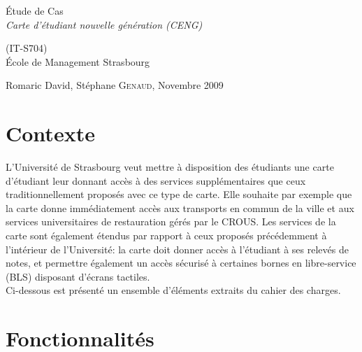 \documentclass[12pt]{article}
\begin{document}
\begin{center}
\begin{Large}
\'Etude de Cas \\
\textit{Carte d'étudiant nouvelle génération (CENG)}
\end{Large}

\begin{Large}
\emph{} (IT-S704)\\
\'Ecole de Management Strasbourg\\
\end{Large}

\vspace{.3cm}
\begin{large}
Romaric David, Stéphane \textsc{Genaud}, Novembre 2009 
\end{large}

\end{center}







\vspace{.5cm}
\section{Contexte}
L'Université de Strasbourg veut mettre à disposition des étudiants une carte d'étudiant
leur donnant accès à des services supplémentaires que ceux traditionnellement proposés
avec ce type de carte. Elle souhaite par exemple que la carte donne immédiatement
accès aux transports en commun de la ville et aux services universitaires de restauration 
gérés par le CROUS.
Les services de la carte sont également étendus par rapport à ceux proposés précédemment
à l'intérieur de l'Université: la carte doit donner accès à l'étudiant à ses relevés de notes,
et permettre également un accès sécurisé à certaines bornes en libre-service (BLS) disposant
d'écrans tactiles.\\

\noindent %
Ci-dessous est présenté un ensemble d'éléments extraits du cahier des charges.


\section{Fonctionnalités}
\end{document}

